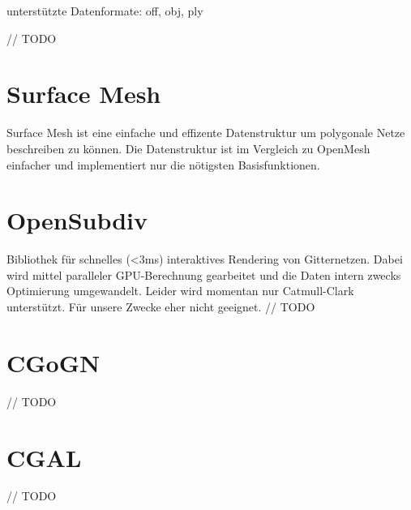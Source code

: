 unterstützte Datenformate: off, obj, ply

// TODO


\section{Surface Mesh}

Surface Mesh ist eine einfache und effizente Datenstruktur um polygonale Netze beschreiben zu können.
Die Datenstruktur ist im Vergleich zu OpenMesh einfacher und implementiert nur die nötigsten Basisfunktionen.


\section{OpenSubdiv}

Bibliothek für schnelles (<3ms) interaktives Rendering von Gitternetzen. Dabei wird mittel paralleler GPU-Berechnung gearbeitet und die Daten intern zwecks Optimierung umgewandelt. Leider wird momentan nur Catmull-Clark unterstützt. Für unsere Zwecke eher nicht geeignet.
// TODO


\section{CGoGN}

// TODO


\section{\acf{CGAL}}

// TODO
